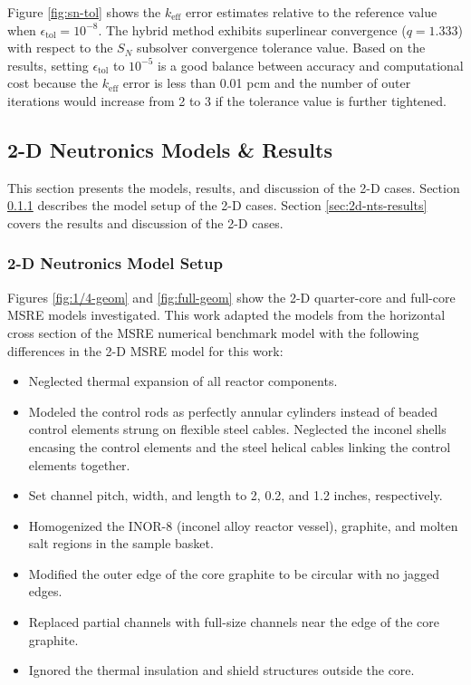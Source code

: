 Figure \ref{fig:sn-tol} shows the $k_\text{eff}$ error estimates relative to the reference value
when $\epsilon_\text{tol}=10^{-8}$. The hybrid method exhibits superlinear convergence ($q=1.333$)
with respect to the $S_N$ subsolver convergence tolerance value. Based on the results, setting
$\epsilon_\text{tol}$ to $10^{-5}$ is a good balance between accuracy and computational
cost because the $k_\text{eff}$ error is less than 0.01 pcm and the number of outer iterations
would increase from 2 to 3 if the tolerance value is further tightened.

\FloatBarrier

\subsection{2-D Neutronics Models \& Results} \label{sec:2d-results}

This section presents the models, results, and discussion of the 2-D cases. Section
\ref{sec:2d-model-setup} describes the model setup of the 2-D cases. Section
\ref{sec:2d-nts-results} covers the results and discussion of the 2-D cases.

\subsubsection{2-D Neutronics Model Setup} \label{sec:2d-model-setup}

Figures \ref{fig:1/4-geom} and \ref{fig:full-geom} show the 2-D quarter-core and full-core
\gls{MSRE} models investigated. This work adapted the models from the horizontal cross section of
the \gls{MSRE} numerical benchmark model \cite{fratoni_molten_2020} with the
following differences in the 2-D \gls{MSRE} model for this work:

\begin{itemize}
  \item Neglected thermal expansion of all reactor components.
  \item Modeled the control rods as perfectly annular cylinders instead of beaded control elements
    strung on flexible steel cables. Neglected the inconel shells encasing the control elements and
    the steel helical cables linking the control elements together.
  \item Set channel pitch, width, and length to 2, 0.2, and 1.2 inches, respectively.
  \item Homogenized the INOR-8 (inconel alloy reactor vessel), graphite, and molten salt regions in the sample basket.
  \item Modified the outer edge of the core graphite to be circular with no jagged edges.
  \item Replaced partial channels with full-size channels near the edge of the core graphite.
  \item Ignored the thermal insulation and shield structures outside the core.
\end{itemize}

